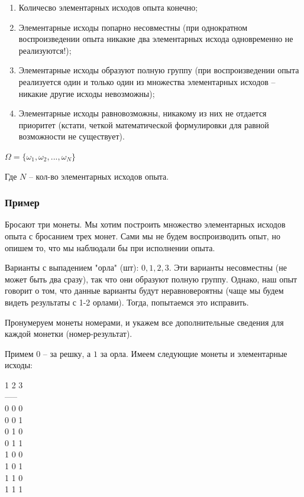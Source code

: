 \documentclass{article}
\begin{document}
\begin{enumerate}
\item Количесво элементарных исходов опыта конечно;
\item Элементарные исходы попарно несовместны (при однократном воспроизведении опыта никакие два элементарных исхода одновременно не реализуются!);
\item Элементарные исходы образуют полную группу (при воспроизведении опыта реализуется один и только один из множества элементарных исходов -- никакие другие исходы невозможны);
\item Элементарные исходы равновозможны, никакому из них не отдается приоритет (кстати, четкой математической формулировки для равной возможности не существует).
\end{enumerate}

$\Omega = \{\omega_1, \omega_2, ..., \omega_N\}$

Где $N$ -- кол-во элементарных исходов опыта.

\subsubsection{Пример}

Бросают три монеты.
Мы хотим построить множество элементарных исходов опыта с бросанием трех монет.
Сами мы не будем воспроизводить опыт, но опишем то, что мы наблюдали бы при исполнении опыта.

Варианты с выпадением "орла" (шт): $0 , 1 , 2 , 3$. Эти варианты несовместны (не может быть два сразу), так что они образуют полную группу. Однако, наш опыт говорит о том, что данные варианты будут неравновероятны (чаще мы будем видеть результаты с 1-2 орлами). Тогда, попытаемся это исправить.

Пронумеруем монеты номерами, и укажем все дополнительные сведения для каждой монетки (номер-результат).

Примем $0$ -- за решку, а $1$ за орла. Имеем следующие монеты и элементарные исходы:

\begin{center}
1 2 3\\
-----\\
0 0 0\\
0 0 1\\
0 1 0\\
0 1 1\\
1 0 0\\
1 0 1\\
1 1 0\\
1 1 1\\
\end{center}
\end{document}
